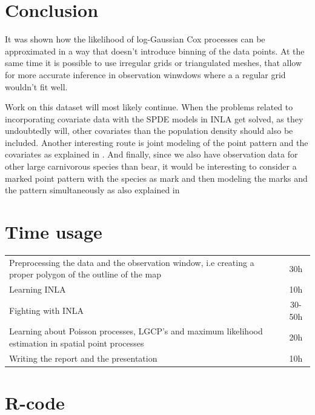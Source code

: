 \documentclass[12pt,a4paper,oneside,article]{memoir}
\begin{document}
\section{Conclusion}

It was shown how the likelihood of log-Gaussian Cox processes can be approximated
in a way that doesn't introduce binning of the data points. At the same time it is
possible to use irregular grids or triangulated meshes, that allow for more accurate inference
in observation winwdows where a a regular grid wouldn't fit well.

Work on this dataset will most likely continue. When the problems related to incorporating
covariate data with the SPDE models in INLA get solved, as they undoubtedly will, other
covariates than the population density should also be included. Another interesting
route is joint modeling of the point pattern and the covariates as explained in \cite{Illian2011}.
And finally, since we also have observation data for other large carnivorous species than
bear, it would be interesting to consider a marked point pattern with the species as mark
and then modeling the marks and the pattern simultaneously as also explained in \cite{Illian2011}



\clearpage
\printbibliography
\clearpage
\appendix

\section{Time usage}
\renewcommand{\arraystretch}{1.5}
\begin{centering}
\begin{tabular}{p{}c}
\toprule
Preprocessing the data and the observation window, i.e
creating a proper polygon of the outline of the map & 30h\\
Learning INLA & 10h\\
Fighting with INLA & 30-50h\\
Learning about Poisson processes, LGCP's and maximum likelihood estimation in
spatial point processes & 20h\\
Writing the report and the presentation & 10h\\
\bottomrule
\end{tabular}
\end{centering}

\section{R-code}



\end{document}
